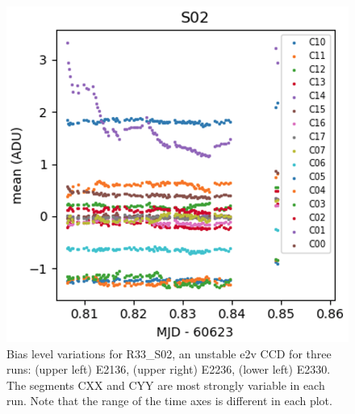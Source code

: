 \begin{figure}[htbp]
\vspace{0.05\textwidth}

\begin{minipage}[b]{0.45\textwidth}
    \centering
    \includegraphics[width=\textwidth]{figures/E2330_R33_S02.png}
\end{minipage}
\hspace{0.05\textwidth}
\hfill
\begin{minipage}[b]{0.45\textwidth}
    \centering
\end{minipage}
\caption{Bias level variations for R33\_S02, an unstable e2v CCD for three runs:  (upper left) E2136, (upper right) E2236, (lower left) E2330.  The segments CXX and CYY are most strongly variable in each run.  Note that the range of the time axes is different in each plot.}
\label{fig:r33_s02_bias}
\end{figure}


%
%

